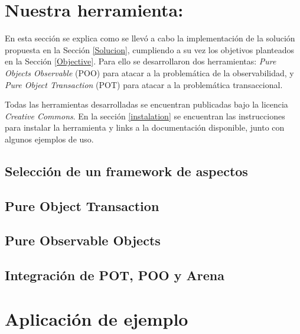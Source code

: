 \section{Nuestra herramienta: }
\label{Implementacion}

	En esta sección se explica como se llevó a cabo la implementación de la solución
	propuesta en la Sección \ref{Solucion}, cumpliendo a su vez los objetivos
	planteados en la Sección \ref{Objective}. Para ello se desarrollaron dos
	herramientas:
	\emph{Pure Objects Observable} (POO) para atacar a la problemática de la
	observabilidad, y \emph{Pure Object Transaction} (POT) para atacar a la
	problemática transaccional.

	Todas las herramientas desarrolladas se encuentran publicadas bajo la licencia \emph{Creative Commons}.
	En la sección \ref{instalation} se encuentran las instrucciones para instalar la herramienta y 
	links a la documentación disponible, junto con algunos ejemplos de uso.
	
\subsection{Selección de un framework de aspectos}
	
	
\subsection{Pure Object Transaction}
	\label{pot} 
	
	
\subsection{Pure Observable Objects}
	\label{poo}
	
	
\subsection{Integración de POT, POO y Arena}
	
	
\section{Aplicación de ejemplo}
	\label{Example}	
	
